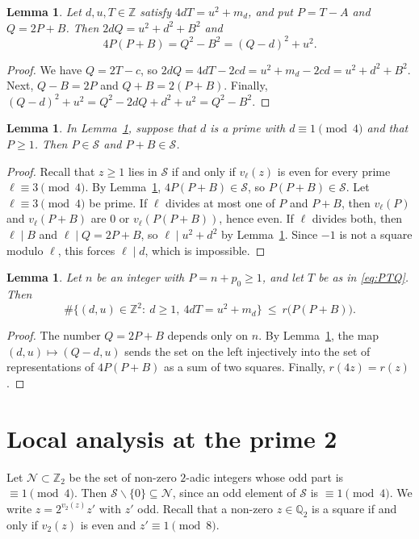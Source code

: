 \documentclass[11pt]{amsart}
\newtheorem{lemma}[theorem]{Lemma}
\theoremstyle{remark}
\theoremstyle{definition}
\numberwithin{equation}{section}
\newcommand{\Sc}{\mathcal{S}}
\newcommand{\Nc}{\mathcal{N}}
\newcommand{\Z}{\mathbb{Z}}
\newcommand{\Zt}{\mathbb{Z}_2}
\newcommand{\Q}{\mathbb{Q}}
\begin{document}
\begin{lemma}\label{lem:identity}
Let $d,u,T\in\Z$ satisfy $4dT=u^2+m_d$, and put $P=T-A$ and $Q=2P+B$. Then $2dQ=u^2+d^2+B^2$ and
\[
4P(P+B)=Q^2-B^2=(Q-d)^2+u^2 .
\]
\end{lemma}

\begin{proof}
We have $Q=2T-c$, so $2dQ=4dT-2cd=u^2+m_d-2cd=u^2+d^2+B^2$. Next, $Q-B=2P$ and $Q+B=2(P+B)$. Finally, $(Q-d)^2+u^2=Q^2-2dQ+d^2+u^2=Q^2-B^2$.
\end{proof}

\begin{lemma}\label{lem:split}
In Lemma~\ref{lem:identity}, suppose that $d$ is a prime with $d\equiv1\pmod 4$ and that $P\ge1$. Then $P\in\Sc$ and $P+B\in\Sc$.
\end{lemma}

\begin{proof}
Recall that $z\ge1$ lies in $\Sc$ if and only if $v_\ell(z)$ is even for every prime $\ell\equiv3\pmod4$. By Lemma~\ref{lem:identity}, $4P(P+B)\in\Sc$, so $P(P+B)\in\Sc$. Let $\ell\equiv3\pmod 4$ be prime. If $\ell$ divides at most one of $P$ and $P+B$, then $v_\ell(P)$ and $v_\ell(P+B)$ are $0$ or $v_\ell(P(P+B))$, hence even. If $\ell$ divides both, then $\ell\mid B$ and $\ell\mid Q=2P+B$, so $\ell\mid u^2+d^2$ by Lemma~\ref{lem:identity}. Since $-1$ is not a square modulo $\ell$, this forces $\ell\mid d$, which is impossible.
\end{proof}

\begin{lemma}\label{lem:mult}
Let $n$ be an integer with $P=n+p_0\ge1$, and let $T$ be as in \eqref{eq:PTQ}. Then
\[
\#\bigl\{(d,u)\in\Z^2:\ d\ge1,\ 4dT=u^2+m_d\bigr\}\ \le\ r\bigl(P(P+B)\bigr).
\]
\end{lemma}

\begin{proof}
The number $Q=2P+B$ depends only on $n$. By Lemma~\ref{lem:identity}, the map $(d,u)\mapsto(Q-d,u)$ sends the set on the left injectively into the set of representations of $4P(P+B)$ as a sum of two squares. Finally, $r(4z)=r(z)$.
\end{proof}

\section{Local analysis at the prime 2}\label{sec:2adic}

Let $\Nc\subset\Zt$ be the set of non-zero $2$-adic integers whose odd part is $\equiv1\pmod 4$. Then $\Sc\smallsetminus\{0\}\subseteq\Nc$, since an odd element of $\Sc$ is $\equiv1\pmod4$. We write $z=2^{v_2(z)}z'$ with $z'$ odd. Recall that a non-zero $z\in\Q_2$ is a square if and only if $v_2(z)$ is even and $z'\equiv1\pmod 8$.
\end{document}
